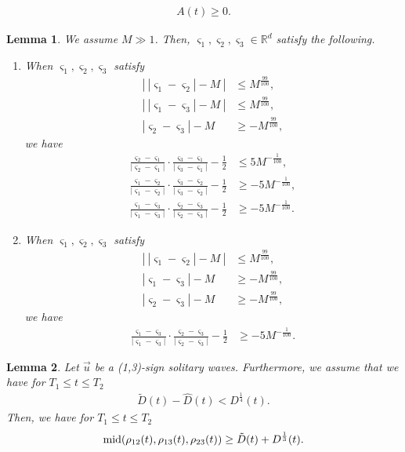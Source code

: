 \documentclass[10pt,a4paper]{amsart}
\newtheorem{lemma}{Lemma}
\newcommand{\m}{\mbox{\textnormal{mid}}}
\begin{document}
\begin{align}\label{Apositive}
A(t)\geq 0.
\end{align}

\begin{lemma}\label{sankakukeilemma}
We assume $M\gg 1$. Then, $\varsigma_1,\varsigma_2,\varsigma_3\in\mathbb{R}^d$ satisfy the following.
\begin{enumerate}
\item When $\varsigma_1,\varsigma_2,\varsigma_3$ satisfy
\begin{align*}
\left|\ |\varsigma_1-\varsigma_2|-M\ \right|&\leq M^{\frac{99}{100}},
\\
\left|\ |\varsigma_1-\varsigma_3|-M\ \right|&\leq M^{\frac{99}{100}},
\\
|\varsigma_2-\varsigma_3|-M&\geq  -M^{\frac{99}{100}},
\end{align*}
we have
\begin{align*}
\frac{\varsigma_2-\varsigma_1}{|\varsigma_2-\varsigma_1|}\cdot \frac{\varsigma_3-\varsigma_1}{|\varsigma_3-\varsigma_1|}-\frac{1}{2}&\leq 5M^{-\frac{1}{100}},
\\
\frac{\varsigma_1-\varsigma_2}{|\varsigma_1-\varsigma_2|}\cdot \frac{\varsigma_3-\varsigma_2}{|\varsigma_3-\varsigma_2|}-\frac{1}{2}&\geq -5M^{-\frac{1}{100}},
\\
\frac{\varsigma_1-\varsigma_3}{|\varsigma_1-\varsigma_3|}\cdot \frac{\varsigma_2-\varsigma_3}{|\varsigma_2-\varsigma_3|}-\frac{1}{2}&\geq -5M^{-\frac{1}{100}}.
\end{align*}

\item When $\varsigma_1,\varsigma_2,\varsigma_3$ satisfy
\begin{align*}
\left|\ |\varsigma_1-\varsigma_2|-M\ \right|&\leq M^{\frac{99}{100}},
\\
|\varsigma_1-\varsigma_3|-M&\geq -M^{\frac{99}{100}},
\\
|\varsigma_2-\varsigma_3|-M&\geq -M^{\frac{99}{100}},
\end{align*}
we have
\begin{align*}
\frac{\varsigma_1-\varsigma_3}{|\varsigma_1-\varsigma_3|}\cdot \frac{\varsigma_2-\varsigma_3}{|\varsigma_2-\varsigma_3|}-\frac{1}{2}&\geq -5M^{-\frac{1}{100}}.
\end{align*}
\end{enumerate}
\end{lemma}

\begin{lemma}\label{midhenchou}
Let $\vec{u}$ be a (1,3)-sign solitary waves. Furthermore, we assume that we have for $T_1\leq t\leq T_2$
\begin{align}\label{estimate0125}
\tilde{D}(t)-\hat{D}(t)<D^{\frac{1}{4}}(t).
\end{align}
Then, we have for $T_1\leq t\leq T_2$
\begin{align}\label{DA21}
\m{(\rho_{12}(t),\rho_{13}(t),\rho_{23}(t))}\geq \tilde{D}(t)+D^{\frac{1}{3}}(t).
\end{align}
\end{lemma}
\end{document}
